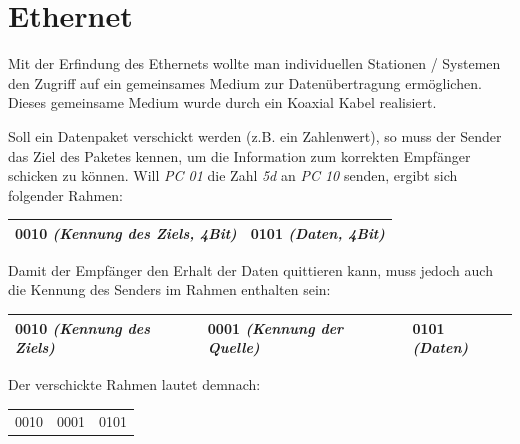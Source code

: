 \documentclass[12pt,a4paper]{article}
\begin{document}
\section{Ethernet}
Mit der Erfindung des Ethernets wollte man individuellen Stationen / Systemen den Zugriff auf ein gemeinsames Medium zur Datenübertragung ermöglichen. Dieses gemeinsame Medium wurde durch ein Koaxial Kabel realisiert.
	\begin{figure}[h]
		\centering
	\end{figure}\newline
Soll ein Datenpaket verschickt werden (z.B. ein Zahlenwert), so muss der Sender das Ziel des Paketes kennen, um die Information zum korrekten Empfänger schicken zu können. \newline
Will \textit{PC 01} die Zahl \textit{5d} an \textit{PC 10} senden, ergibt sich folgender Rahmen:
	\begin{center}
		\begin{tabularx}{14cm}{|X|X|}
			\hline
			0010 \textit{(Kennung des Ziels, 4Bit)}&0101 \textit{(Daten, 4Bit)}\\
			\hline
		\end{tabularx}
	\end{center}
Damit der Empfänger den Erhalt der Daten quittieren kann, muss jedoch auch die Kennung des Senders im Rahmen enthalten sein:
	\begin{center}
		\begin{tabularx}{17cm}{|X|X|X|}
			\hline
			0010 \textit{(Kennung des Ziels)}&0001 \textit{(Kennung der Quelle)}&0101 \textit{(Daten)}\\
			\hline
		\end{tabularx}
	\end{center}
Der verschickte Rahmen lautet demnach:
	\begin{center}
		\begin{tabularx}{5cm}{XXX}
			0010&0001&0101\\
		\end{tabularx}
	\end{center}
\end{document}
